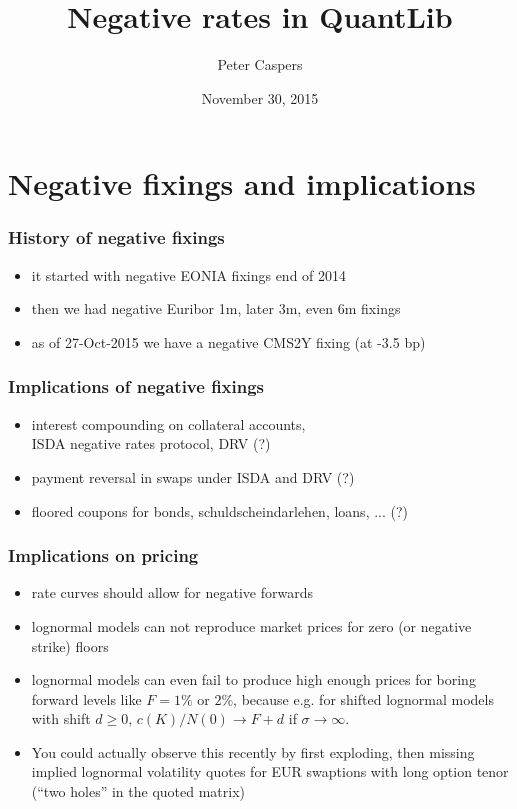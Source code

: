 \documentclass{beamer}
\begin{document}
\title{Negative rates in QuantLib}
\author{Peter Caspers}
\date{November 30, 2015}

\frame{\titlepage}


\section{Negative fixings and implications}

\begin{frame}[fragile]
\frametitle{History of negative fixings}
\begin{itemize}
\item it started with negative EONIA fixings end of 2014
\item then we had negative Euribor 1m, later 3m, even 6m fixings
\item as of 27-Oct-2015 we have a negative CMS2Y fixing (at -3.5 bp)
\end{itemize}
\end{frame}

\begin{frame}[fragile]
\frametitle{Implications of negative fixings}
\begin{itemize}
\item interest compounding on collateral accounts,\\
ISDA negative rates protocol, DRV (?)
\item payment reversal in swaps under ISDA and DRV (?)
\item floored coupons for bonds, schuldscheindarlehen, loans, ... (?)
\end{itemize}
\end{frame}

\begin{frame}[fragile]
\frametitle{Implications on pricing}
\begin{itemize}
\item rate curves should allow for negative forwards
\item lognormal models can not reproduce market prices for zero (or negative strike) floors
\item lognormal models can even fail to produce high enough prices for boring forward levels like $F=1\%$ or $2\%$, because e.g. for shifted lognormal models with shift $d\geq0$, $c(K)/N(0)\rightarrow F+d$ if $\sigma\rightarrow\infty$. 
\item You could actually observe this recently by first exploding, then missing implied lognormal volatility quotes for EUR swaptions with long option tenor (``two holes'' in the quoted matrix)
\end{itemize}
\end{frame}
\end{document}
